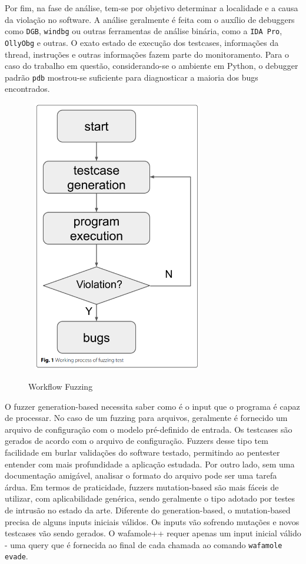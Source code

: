 Por fim, na fase de análise, tem-se por objetivo determinar a localidade e a causa da violação no software. A análise geralmente é feita com o auxílio de debuggers como \verb+DGB+, \verb+windbg+ ou outras ferramentas de análise binária, como a \verb+IDA Pro+, \verb+OllyObg+ e outras. O exato estado de execução dos testcases, informações da thread, instruções e outras informações fazem parte do monitoramento. Para o caso do trabalho em questão, considerando-se o ambiente em Python, o debugger padrão \verb+pdb+ mostrou-se suficiente para diagnosticar a maioria dos bugs encontrados.

\begin{figure}[ht]
    \centering
    \caption{Workflow Fuzzing}
    \includegraphics[width=8cm,height=12cm,keepaspectratio]{figuras/fuzzing imagem.png} 
    \label{fig:internet} 
\end{figure}

O fuzzer generation-based necessita saber como é o input que o programa é capaz de processar. No caso de um fuzzing para arquivos, geralmente é fornecido um arquivo de configuração com o modelo pré-definido de entrada. Os testcases são gerados de acordo com o arquivo de configuração. Fuzzers desse tipo tem facilidade em burlar validações do software testado, permitindo ao pentester entender com mais profundidade a aplicação estudada. Por outro lado, sem uma documentação amigável, analisar o formato do arquivo pode ser uma tarefa árdua.
Em termos de praticidade, fuzzers mutation-based são mais fáceis de utilizar, com aplicabilidade genérica, sendo geralmente o tipo adotado por testes de intrusão no estado da arte. Diferente do generation-based, o mutation-based precisa de alguns inputs iniciais válidos. Os inputs vão sofrendo mutações e novos testcases vão sendo gerados. O wafamole++ requer apenas um input inicial válido - uma query que é fornecida ao final de cada chamada ao comando \verb+wafamole evade+.

